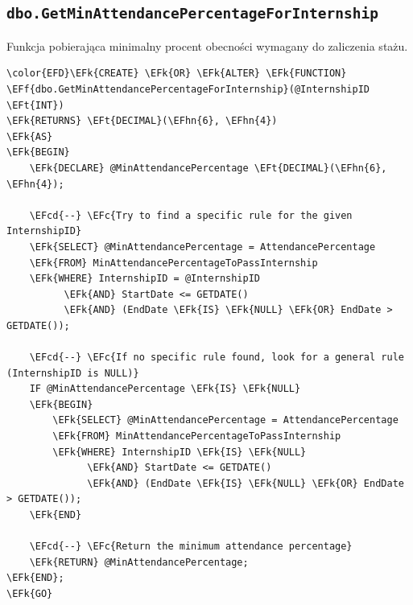 \documentclass[11pt]{article}
\newcommand{\EFc}[1]{\textcolor{EFc}{\textit{#1}}} %
\newcommand{\EFcd}[1]{\textcolor{EFcd}{\textit{#1}}} %
\newcommand{\EFk}[1]{\textcolor{EFk}{\textbf{#1}}} %
\newcommand{\EFf}[1]{\textcolor{EFf}{#1}} %
\newcommand{\EFt}[1]{\textcolor{EFt}{\textbf{#1}}} %
\newcommand{\EFhn}[1]{\textcolor{EFhn}{#1}} %
\begin{document}
\subsection{\texttt{dbo.GetMinAttendancePercentageForInternship}}
\label{sec:org66f05ae}
Funkcja pobierająca minimalny procent obecności wymagany do zaliczenia stażu.
\begin{Code}
\begin{Verbatim}
\color{EFD}\EFk{CREATE} \EFk{OR} \EFk{ALTER} \EFk{FUNCTION} \EFf{dbo.GetMinAttendancePercentageForInternship}(@InternshipID \EFt{INT})
\EFk{RETURNS} \EFt{DECIMAL}(\EFhn{6}, \EFhn{4})
\EFk{AS}
\EFk{BEGIN}
    \EFk{DECLARE} @MinAttendancePercentage \EFt{DECIMAL}(\EFhn{6}, \EFhn{4});

    \EFcd{--} \EFc{Try to find a specific rule for the given InternshipID}
    \EFk{SELECT} @MinAttendancePercentage = AttendancePercentage
    \EFk{FROM} MinAttendancePercentageToPassInternship
    \EFk{WHERE} InternshipID = @InternshipID
          \EFk{AND} StartDate <= GETDATE()
          \EFk{AND} (EndDate \EFk{IS} \EFk{NULL} \EFk{OR} EndDate > GETDATE());

    \EFcd{--} \EFc{If no specific rule found, look for a general rule (InternshipID is NULL)}
    IF @MinAttendancePercentage \EFk{IS} \EFk{NULL}
    \EFk{BEGIN}
        \EFk{SELECT} @MinAttendancePercentage = AttendancePercentage
        \EFk{FROM} MinAttendancePercentageToPassInternship
        \EFk{WHERE} InternshipID \EFk{IS} \EFk{NULL}
              \EFk{AND} StartDate <= GETDATE()
              \EFk{AND} (EndDate \EFk{IS} \EFk{NULL} \EFk{OR} EndDate > GETDATE());
    \EFk{END}

    \EFcd{--} \EFc{Return the minimum attendance percentage}
    \EFk{RETURN} @MinAttendancePercentage;
\EFk{END};
\EFk{GO}
\end{Verbatim}
\end{Code}
\end{document}
